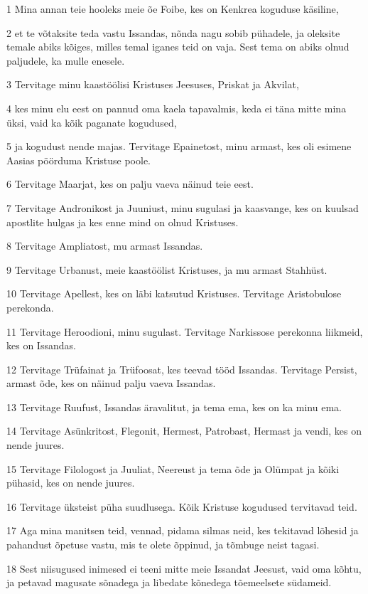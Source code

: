 \par 1 Mina annan teie hooleks meie õe Foibe, kes on Kenkrea koguduse käsiline,
\par 2 et te võtaksite teda vastu Issandas, nõnda nagu sobib pühadele, ja oleksite temale abiks kõiges, milles temal iganes teid on vaja. Sest tema on abiks olnud paljudele, ka mulle enesele.
\par 3 Tervitage minu kaastöölisi Kristuses Jeesuses, Priskat ja Akvilat,
\par 4 kes minu elu eest on pannud oma kaela tapavalmis, keda ei täna mitte mina üksi, vaid ka kõik paganate kogudused,
\par 5 ja kogudust nende majas. Tervitage Epainetost, minu armast, kes oli esimene Aasias pöörduma Kristuse poole.
\par 6 Tervitage Maarjat, kes on palju vaeva näinud teie eest.
\par 7 Tervitage Andronikost ja Juuniust, minu sugulasi ja kaasvange, kes on kuulsad apostlite hulgas ja kes enne mind on olnud Kristuses.
\par 8 Tervitage Ampliatost, mu armast Issandas.
\par 9 Tervitage Urbanust, meie kaastöölist Kristuses, ja mu armast Stahhüst.
\par 10 Tervitage Apellest, kes on läbi katsutud Kristuses. Tervitage Aristobulose perekonda.
\par 11 Tervitage Heroodioni, minu sugulast. Tervitage Narkissose perekonna liikmeid, kes on Issandas.
\par 12 Tervitage Trüfainat ja Trüfoosat, kes teevad tööd Issandas. Tervitage Persist, armast õde, kes on näinud palju vaeva Issandas.
\par 13 Tervitage Ruufust, Issandas äravalitut, ja tema ema, kes on ka minu ema.
\par 14 Tervitage Asünkritost, Flegonit, Hermest, Patrobast, Hermast ja vendi, kes on nende juures.
\par 15 Tervitage Filologost ja Juuliat, Neereust ja tema õde ja Olümpat ja kõiki pühasid, kes on nende juures.
\par 16 Tervitage üksteist püha suudlusega. Kõik Kristuse kogudused tervitavad teid.
\par 17 Aga mina manitsen teid, vennad, pidama silmas neid, kes tekitavad lõhesid ja pahandust õpetuse vastu, mis te olete õppinud, ja tõmbuge neist tagasi.
\par 18 Sest niisugused inimesed ei teeni mitte meie Issandat Jeesust, vaid oma kõhtu, ja petavad magusate sõnadega ja libedate kõnedega tõemeelsete südameid.
